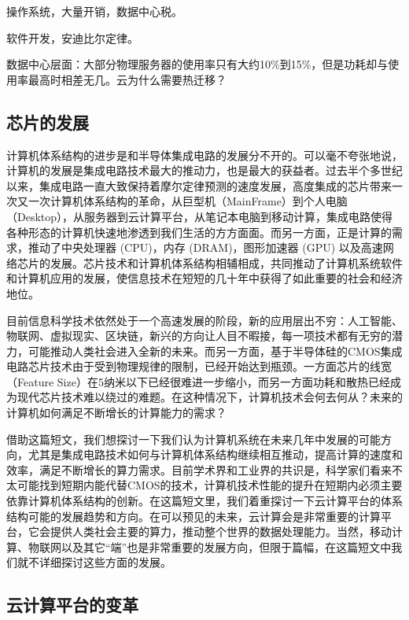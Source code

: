 操作系统，大量开销，数据中心税。

软件开发，安迪比尔定律。

数据中心层面：大部分物理服务器的使用率只有大约10\%到15\%，但是功耗却与使用率最高时相差无几。云为什么需要热迁移？


\iffalse

\subsection{芯片的发展}

计算机体系结构的进步是和半导体集成电路的发展分不开的。可以毫不夸张地说，计算机的发展是集成电路技术最大的推动力，也是最大的获益者。过去半个多世纪以来，集成电路一直大致保持着摩尔定律预测的速度发展，高度集成的芯片带来一次又一次计算机体系结构的革命，从巨型机（MainFrame）到个人电脑（Desktop），从服务器到云计算平台，从笔记本电脑到移动计算，集成电路使得各种形态的计算机快速地渗透到我们生活的方方面面。而另一方面，正是计算的需求，推动了中央处理器 (CPU)，内存 (DRAM)，图形加速器 (GPU) 以及高速网络芯片的发展。芯片技术和计算机体系结构相辅相成，共同推动了计算机系统软件和计算机应用的发展，使信息技术在短短的几十年中获得了如此重要的社会和经济地位。

目前信息科学技术依然处于一个高速发展的阶段，新的应用层出不穷：人工智能、物联网、虚拟现实、区块链，新兴的方向让人目不暇接，每一项技术都有无穷的潜力，可能推动人类社会进入全新的未来。而另一方面，基于半导体硅的CMOS集成电路芯片技术由于受到物理规律的限制，已经开始达到瓶颈。一方面芯片的线宽（Feature Size）在5纳米以下已经很难进一步缩小，而另一方面功耗和散热已经成为现代芯片技术难以绕过的难题。在这种情况下，计算机技术会何去何从？未来的计算机如何满足不断增长的计算能力的需求？

借助这篇短文，我们想探讨一下我们认为计算机系统在未来几年中发展的可能方向，尤其是集成电路技术如何与计算机体系结构继续相互推动，提高计算的速度和效率，满足不断增长的算力需求。目前学术界和工业界的共识是，科学家们看来不太可能找到短期内能代替CMOS的技术，计算机技术性能的提升在短期内必须主要依靠计算机体系结构的创新。在这篇短文里，我们着重探讨一下云计算平台的体系结构可能的发展趋势和方向。在可以预见的未来，云计算会是非常重要的计算平台，它会提供人类社会主要的算力，推动整个世界的数据处理能力。当然，移动计算、物联网以及其它“端”也是非常重要的发展方向，但限于篇幅，在这篇短文中我们就不详细探讨这些方面的发展。

\subsection{云计算平台的变革}

